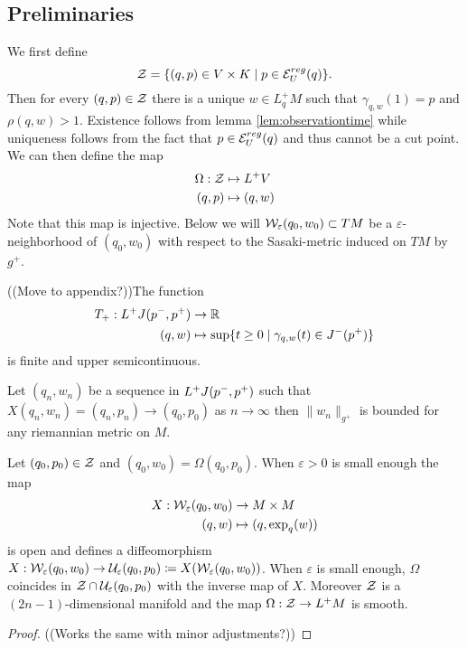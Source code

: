 \subsection{Preliminaries}

\begin{definition}[Coordinates on $V$]
We first define 
\[
    \mathcal{Z} = \{(q,p)\in V\times K \mid p\in \mathcal{E}_U^{reg}(q)\}.
\] 
Then for every $(q,p)\in \mathcal{Z}$ there is a unique $w\in L^+_qM$ such that $\gamma_{q,w}(1)=p$ and $\rho(q,w)>1$. Existence follows from lemma \ref{lem:observationtime} while uniqueness follows from the fact that $p\in \mathcal{E}_U^{reg}(q)$ and thus cannot be a cut point. 
We can then define the map
\begin{align*}
    \Omega:\mathcal{Z}&\mapsto L^+V\\
    (q,p)&\mapsto (q,w)
\end{align*}
Note that this map is injective.
Below we will $\mathcal{W}_\varepsilon(q_0,w_0)\subset TM$ be a $\varepsilon$-neighborhood of $(q_0,w_0)$ with respect to the Sasaki-metric induced on $TM$ by $g^+$.
\end{definition}

\begin{lemma}((Move to appendix?))The function
    \begin{align*}
        T_+:L^+J(p^-,p^+)&\to \mathbb{R} \\
        (q,w)&\mapsto \sup \{ t\ge 0 \mid \gamma_{q,w}(t)\in J^-(p^+)\}
    \end{align*}
    is finite and upper semicontinuous.
\end{lemma}
\begin{corollary}
    Let $(q_n,w_n)$ be a sequence in $L^+J(p^-,p^+)$ such that $X(q_n,w_n)=(q_n,p_n)\to (q_0,p_0)$ as $n\to \infty$ then $\lVert w_n \rVert_{g^+}$ is bounded for any riemannian metric on $M$.
\end{corollary}

\begin{lemma}
Let $(q_0,p_0)\in \mathcal{Z}$ and $(q_0,w_0)=\Omega(q_0,p_0)$. When $\varepsilon>0$ is small enough the map 
\begin{align*}
    X:\mathcal{W}_\varepsilon(q_0,w_0) &\to M\times M\\
    (q,w) &\mapsto (q,\exp_q(w))
\end{align*}
is open and defines a diffeomorphism $X:\mathcal{W}_\varepsilon(q_0,w_0)\to \mathcal{U}_\varepsilon(q_0,p_0) \coloneqq X(\mathcal{W}_\varepsilon(q_0,w_0))$. When $\varepsilon$ is small enough, $\Omega$ coincides in $\mathcal{Z}\cap \mathcal{U}_\varepsilon(q_0,p_0)$ with the inverse map of $X$. Moreover $\mathcal{Z}$ is a $(2n-1)$-dimensional manifold and the map $\Omega:\mathcal{Z}\to L^+M$ is smooth.
\end{lemma}
\begin{proof}
((Works the same with minor adjustments?))
\end{proof}


